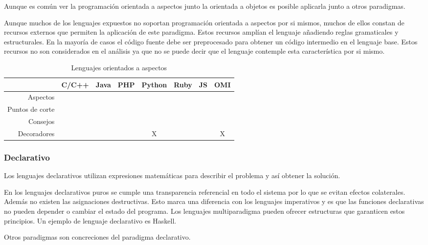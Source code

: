 Aunque es común ver la programación orientada a aspectos junto la orientada a objetos es posible 
aplicarla junto a otros paradigmas. 

Aunque muchos de los lenguajes expuestos no soportan programación orientada a aspectos
por si mismos, muchos de ellos constan de recursos externos que permiten 
la aplicación de este paradigma. Estos recursos amplían el lenguaje 
añadiendo reglas gramaticales y estructurales. En la mayoría de casos 
el código fuente debe ser preprocesado para obtener un código intermedio
en el lenguaje base. Estos recursos no son considerados en el análisis 
ya que no se puede decir que el lenguaje contemple esta característica por si mismo.

\FloatBarrier
\begin{table}[h]
\begin{center}
 
\begin{tabular}{|r|c|c|c|c|c|c|c|} \hline
 & C/C++ & Java & PHP  & Python & Ruby & JS & OMI\\ \hline
Aspectos & & &  &  &  &  &  \\ \hline
Puntos de corte & & & &  &  &  &  \\ \hline
Consejos   & & & & & & &  \\ \hline
Decoradores   & & & & X & & & X \\ \hline
\end{tabular}
\end{center}
\caption{Lenguajes orientados a aspectos}
\end{table}
\FloatBarrier

\subsubsection {Declarativo}
Los lenguajes declarativos utilizan expresiones matemáticas para describir el problema y así obtener la solución.  

En los lenguajes declarativos puros se cumple una transparencia referencial en todo el sistema por lo
que se evitan efectos colaterales. Además no existen las asignaciones destructivas. Esto marca una diferencia 
con los lenguajes imperativos y es que las funciones declarativas no pueden depender o cambiar el estado del 
programa. Los lenguajes multiparadigma pueden ofrecer estructuras que garanticen estos principios. Un ejemplo de lenguaje 
declarativo es Haskell.

Otros paradigmas son concreciones del paradigma declarativo. 

